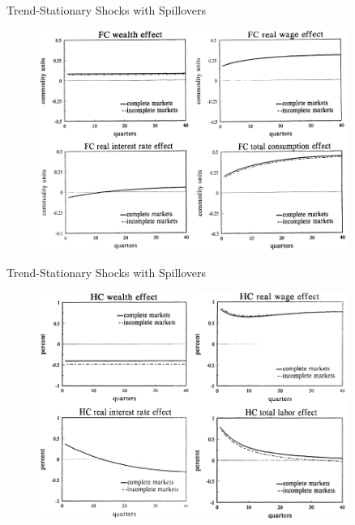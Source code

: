\documentclass[10pt]{beamer}
\begin{document}
\begin{frame}{Trend-Stationary Shocks with Spillovers}
\begin{figure}[thbp]
  \centering
  \includegraphics[width=0.90\textwidth]{21.png}
\end{figure}
\end{frame}

\begin{frame}{Trend-Stationary Shocks with Spillovers}
\begin{figure}[thbp]
  \centering
  \includegraphics[width=0.90\textwidth]{22.png}
\end{figure}
\end{frame}
\end{document}
